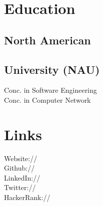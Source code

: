 \documentclass[]{deedy-resume-openfont}
\begin{document}
%
%
\lastupdated

%
%



%
%

\begin{minipage}[t]{0.33\textwidth} 


\section{Education} 

\subsection{North American}
\subsection{University (NAU)}

Conc. in Software Engineering \\
Conc. in Computer Network \\

\sectionsep



\section{Links} 
Website:// \href{http://nadide.github.io/}{} \\
Github:// \href{https://github.com/nadide}{} \\
LinkedIn://  \href{https://www.linkedin.com/in/nadidepasali/}{} \\
Twitter://  \href{https://twitter.com/nadidepasali}{} \\
HackerRank://  \href{https://www.hackerrank.com/nddpasali}{}
\sectionsep


\end{minipage}
\end{document}
